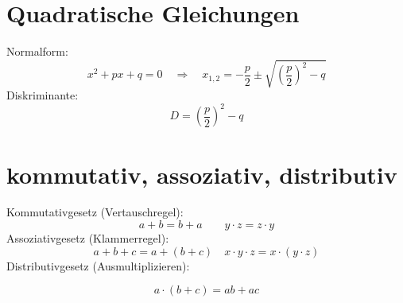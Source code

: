 
\section{Quadratische Gleichungen}
\label{sec:QuadratischeGleichungen}
Normalform:
\[
x^2+px+q=0 \quad \Rightarrow \quad x_{1,2}=-\frac{p}{2}\pm\sqrt{\left(\frac{p}{2}\right)^2-q}
\]
Diskriminante:
\[
D=\left(\frac{p}{2}\right)^2-q
\]
\section{kommutativ, assoziativ, distributiv}
\label{sec:KommutativAssoziativDistributiv}
Kommutativgesetz (Vertauschregel):
\[
a+b=b+a \qquad y\cdot z = z \cdot y
\]
Assoziativgesetz (Klammerregel):
\[
a+b+c=a+(b+c) \quad	x\cdot y \cdot z =x\cdot (y \cdot z) 
\]
Distributivgesetz (Ausmultiplizieren):

\[
a \cdot(b+c)=ab+ac
\]